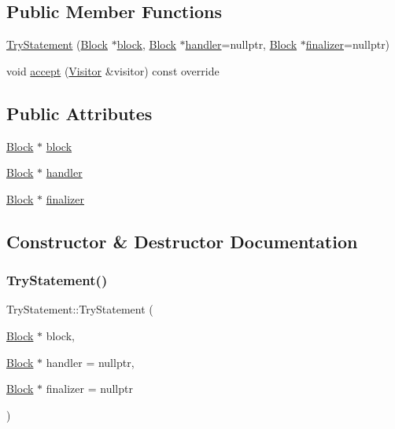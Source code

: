 \subsection*{Public Member Functions}
\begin{DoxyCompactItemize}
\item 
\hyperlink{struct_try_statement_ac3dece791d96a6aa4ce0b5c944ae20f0}{Try\+Statement} (\hyperlink{struct_block}{Block} $\ast$\hyperlink{struct_try_statement_aeea1fa5fce0062d0f8d427d4706d1f73}{block}, \hyperlink{struct_block}{Block} $\ast$\hyperlink{struct_try_statement_a4d97ad90948102f8e6dca2051f03ceb0}{handler}=nullptr, \hyperlink{struct_block}{Block} $\ast$\hyperlink{struct_try_statement_a95cbb6dbd527aad85fa40f0b8b98b66c}{finalizer}=nullptr)
\item 
void \hyperlink{struct_try_statement_af223e8205727843aa77651caeb89b805}{accept} (\hyperlink{struct_visitor}{Visitor} \&visitor) const override
\end{DoxyCompactItemize}
\subsection*{Public Attributes}
\begin{DoxyCompactItemize}
\item 
\hyperlink{struct_block}{Block} $\ast$ \hyperlink{struct_try_statement_aeea1fa5fce0062d0f8d427d4706d1f73}{block}
\item 
\hyperlink{struct_block}{Block} $\ast$ \hyperlink{struct_try_statement_a4d97ad90948102f8e6dca2051f03ceb0}{handler}
\item 
\hyperlink{struct_block}{Block} $\ast$ \hyperlink{struct_try_statement_a95cbb6dbd527aad85fa40f0b8b98b66c}{finalizer}
\end{DoxyCompactItemize}


\subsection{Constructor \& Destructor Documentation}
\mbox{\label{struct_try_statement_ac3dece791d96a6aa4ce0b5c944ae20f0}} 
\subsubsection{\texorpdfstring{Try\+Statement()}{TryStatement()}}
{\footnotesize\ttfamily Try\+Statement\+::\+Try\+Statement (\begin{DoxyParamCaption}\item[{\hyperlink{struct_block}{Block} $\ast$}]{block,  }\item[{\hyperlink{struct_block}{Block} $\ast$}]{handler = {\ttfamily nullptr},  }\item[{\hyperlink{struct_block}{Block} $\ast$}]{finalizer = {\ttfamily nullptr} }\end{DoxyParamCaption})\hspace{0.3cm}{\ttfamily [inline]}}



